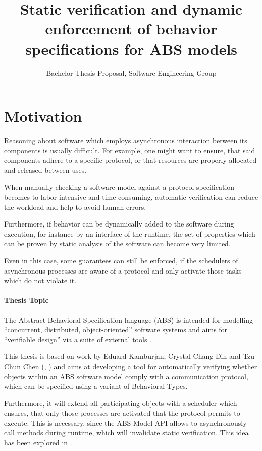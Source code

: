 \documentclass[paper=a4,nochapname,accentcolor=tud9c]{tudexercise}
\title{Static verification and dynamic enforcement of behavior specifications for ABS models}
\subtitle{Bachelor Thesis Proposal, Software Engineering Group}
\begin{document}
%
\maketitle
%
\tableofcontents

\section{Motivation}
Reasoning about software which employs asynchronous interaction between its
components is usually difficult.
For example, one might want to ensure, that said components adhere to a specific
protocol, or that resources are properly allocated and released between uses.

When manually checking a software model against a protocol specification becomes
to labor intensive and time consuming, automatic verification can reduce the
workload and help to avoid human errors.

Furthermore, if behavior can be dynamically added to the software during execution,
for instance by an interface of the runtime, the set of properties which
can be proven by static analysis of the software can become very limited.

Even in this case, some guarantees can still be enforced, if the schedulers of
asynchronous processes are aware of a protocol and only activate those tasks
which do not violate it.

\paragraph{Thesis Topic}

The Abstract Behavioral Specification language (ABS) is intended for modelling
``concurrent, distributed, object-oriented'' software systems and
aims for ``verifiable design'' via a suite of external tools \cite{absdesign}.

This thesis is based on work by Eduard Kamburjan, Crystal Chang Din and
Tzu-Chun Chen (\cite{kamburjan2018stateful}, \cite{kamburjan2016session}) and
aims at developing a tool for automatically verifying whether objects within an
ABS software model comply with a communication protocol, which can be specified
using a variant of Behavioral Types. %

Furthermore, it will extend all participating objects with a scheduler \cite{absschedulers} which
ensures, that only those processes are activated that the protocol permits to execute.
This is necessary, since the ABS Model API \cite{absmodelapi} allows to asynchronously call methods during
runtime, which will invalidate static verification.
This idea has been explored in \cite{kamburjan2016session}.
\end{document}
